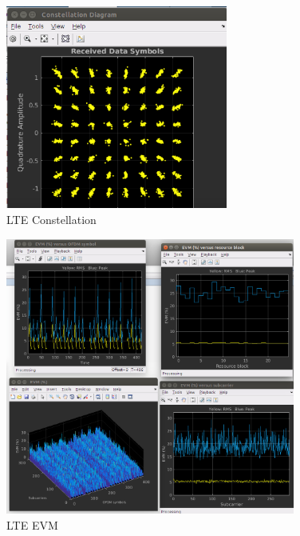\begin{figure}[htbp]
    \centering
    \includegraphics[width=0.65\textwidth]{./figures/lte_constellation_iio}
    \caption{ LTE Constellation
    \label{fig:lteconstellationiio}}
\end{figure}

\begin{figure}[htbp]
    \centering
    \includegraphics[width=0.85\textwidth]{./figures/lte_evm_iio}
    \caption{ LTE EVM
    \label{fig:lteevmiio}}
\end{figure}

\vfill
\clearpage
